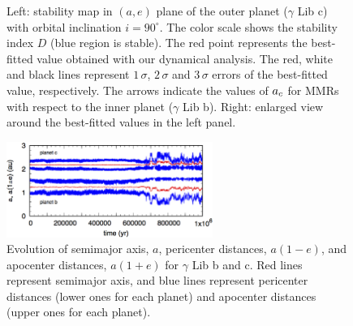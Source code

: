 \documentclass[]{pasj01}
\begin{document}
\begin{figure}
\begin{minipage}{0.48\hsize}
\begin{center}
\end{center}
\end{minipage}

\caption{Left: stability map in $(a, e)$ plane of the outer planet ($\gamma$ Lib c) with orbital inclination $i=90^{\circ}$.
The color scale shows the stability index $D$ (blue region is stable).
The red point represents the best-fitted value obtained with our dynamical analysis.
The red, white and black lines represent $1\,\sigma$, $2\,\sigma$ and $3\,\sigma$ errors of the best-fitted value, respectively.
The arrows indicate the values of $a_{\rm c}$ for MMRs with respect to the inner planet ($\gamma$ Lib b).
Right: enlarged view around the best-fitted values in the left panel.}
\label{fig:acec}
\end{figure}

\begin{figure}
\begin{center}
\includegraphics[width=0.6\textwidth]{fig1e6.eps}
\end{center}
\caption{Evolution of semimajor axis, $a$, pericenter distances, $a(1-e)$, and apocenter distances, $a(1+e)$ for $\gamma$ Lib b and c.
Red lines represent semimajor axis, and blue lines represent pericenter distances (lower ones for each planet) and apocenter distances (upper ones for each planet).}
\label{fig:1e6}
\end{figure}
\end{document}
